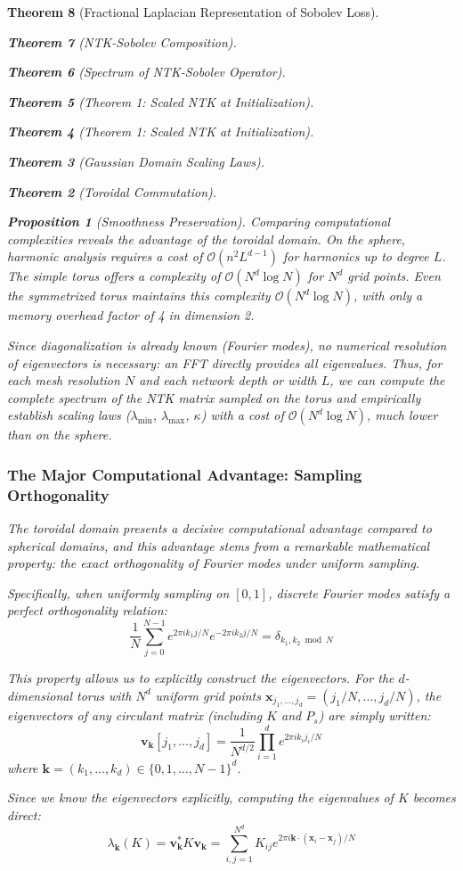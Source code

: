 \documentclass{article}
\newtheorem{theorem}{Theorem}[section]
\newtheorem{proposition}[theorem]{Proposition}
\begin{document}
\begin{theorem}[Fractional Laplacian Representation of Sobolev Loss]
\begin{theorem}[NTK-Sobolev Composition]
\begin{theorem}[Spectrum of NTK-Sobolev Operator]
\begin{theorem}[Theorem 1: Scaled NTK at Initialization]
\begin{theorem}[Theorem 1: Scaled NTK at Initialization]
\begin{theorem}[Gaussian Domain Scaling Laws]
\begin{theorem}[Toroidal Commutation]
\begin{proposition}[Smoothness Preservation]
Comparing computational complexities reveals the advantage of the toroidal domain. On the sphere, harmonic analysis requires a cost of $\mathcal{O}(n^2 L^{d-1})$ for harmonics up to degree $L$. The simple torus offers a complexity of $\mathcal{O}(N^d \log N)$ for $N^d$ grid points. Even the symmetrized torus maintains this complexity $\mathcal{O}(N^d \log N)$, with only a memory overhead factor of 4 in dimension 2.

Since diagonalization is already known (Fourier modes), no numerical resolution of eigenvectors is necessary: an FFT directly provides all eigenvalues. Thus, for each mesh resolution $N$ and each network depth or width $L$, we can compute the complete spectrum of the NTK matrix sampled on the torus and empirically establish scaling laws ($\lambda_{\min}$, $\lambda_{\max}$, $\kappa$) with a cost of $\mathcal{O}(N^{d}\log N)$, much lower than on the sphere.

\subsubsection{The Major Computational Advantage: Sampling Orthogonality}

The toroidal domain presents a decisive computational advantage compared to spherical domains, and this advantage stems from a remarkable mathematical property: the exact orthogonality of Fourier modes under uniform sampling.

Specifically, when uniformly sampling on $[0,1]$, discrete Fourier modes satisfy a perfect orthogonality relation:
\[ \frac{1}{N} \sum_{j=0}^{N-1} e^{2\pi i k_1 j/N} e^{-2\pi i k_2 j/N} = \delta_{k_1, k_2 \bmod N} \]

This property allows us to explicitly construct the eigenvectors. For the $d$-dimensional torus with $N^d$ uniform grid points $\mathbf{x}_{j_1,\ldots,j_d} = (j_1/N, \ldots, j_d/N)$, the eigenvectors of any circulant matrix (including $K$ and $P_s$) are simply written:
\[ \mathbf{v}_{\mathbf{k}}[j_1, \ldots, j_d] = \frac{1}{N^{d/2}} \prod_{i=1}^d e^{2\pi i k_i j_i/N} \]
where $\mathbf{k} = (k_1, \ldots, k_d) \in \{0, 1, \ldots, N-1\}^d$.

Since we know the eigenvectors explicitly, computing the eigenvalues of $K$ becomes direct:
\[ \lambda_{\mathbf{k}}(K) = \mathbf{v}_{\mathbf{k}}^* K \mathbf{v}_{\mathbf{k}} = \sum_{i,j=1}^{N^d} K_{ij} e^{2\pi i \mathbf{k} \cdot (\mathbf{x}_i - \mathbf{x}_j)/N} \]


\end{proposition}
\end{theorem}
\end{theorem}
\end{theorem}
\end{theorem}
\end{theorem}
\end{theorem}
\end{theorem}
\end{document}
